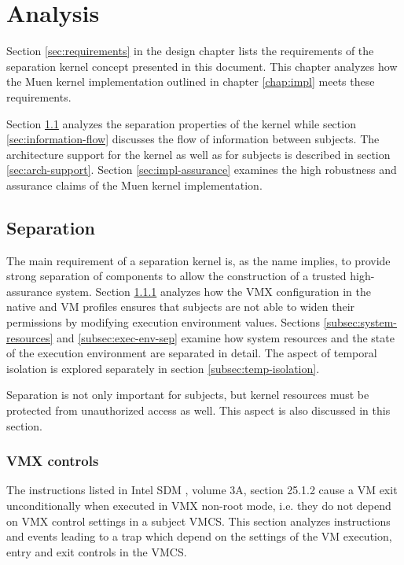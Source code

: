 \chapter{Analysis}
Section \ref{sec:requirements} in the design chapter lists the requirements of
the separation kernel concept presented in this document. This chapter analyzes
how the Muen kernel implementation outlined in chapter \ref{chap:impl} meets
these requirements.

Section \ref{sec:separation} analyzes the separation properties of the kernel
while section \ref{sec:information-flow} discusses the flow of information
between subjects. The architecture support for the kernel as well as for
subjects is described in section \ref{sec:arch-support}. Section
\ref{sec:impl-assurance} examines the high robustness and assurance claims of
the Muen kernel implementation.

\section{Separation}\label{sec:separation}
The main requirement of a separation kernel is, as the name implies, to provide
strong separation of components to allow the construction of a trusted
high-assurance system. Section \ref{subsec:vmx-controls} analyzes how the VMX
configuration in the native and VM profiles ensures that subjects are not able
to widen their permissions by modifying execution environment values. Sections
\ref{subsec:system-resources} and \ref{subsec:exec-env-sep} examine how system
resources and the state of the execution environment are separated in detail.
The aspect of temporal isolation is explored separately in section
\ref{subsec:temp-isolation}.

Separation is not only important for subjects, but kernel resources must be
protected from unauthorized access as well. This aspect is also discussed in
this section.

\subsection{VMX controls}\label{subsec:vmx-controls}
The instructions listed in Intel SDM \cite{IntelSDM}, volume 3A, section 25.1.2
cause a VM exit unconditionally when executed in VMX non-root mode, i.e. they
do not depend on VMX control settings in a subject VMCS. This section analyzes
instructions and events leading to a trap which depend on the settings of the
VM execution, entry and exit controls in the VMCS.


